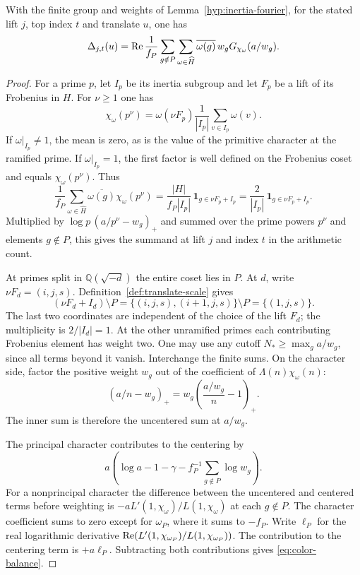\begin{lemma}
With the finite group and weights of Lemma~\ref{hyp:inertia-fourier},
for the stated lift \(j\), top index \(t\) and translate \(u\), one has
\begin{equation}\label{eq:color-balance}
  \Delta_{j,t}(u)=
  \operatorname{Re}\frac1{f_P}\sum_{g\notin P}\sum_{\omega\in\widehat H}
       \overline{\omega(g)}\,w_g G_{\chi_\omega}(a/w_g).
\end{equation}
\end{lemma}

\begin{proof}
For a prime \(p\), let \(I_p\) be its
inertia subgroup and let \(F_p\) be a lift of its Frobenius in
\(H\). For \(\nu\ge1\) one has
\[
 \chi_\omega(p^\nu)
   =\omega(\nu F_p)\frac1{|I_p|}\sum_{v\in I_p}\omega(v).
\]
If \(\omega|_{I_p}\ne1\), the mean is zero, as is the value
of the primitive character at the ramified prime. If
\(\omega|_{I_p}=1\), the first factor is well defined on the
Frobenius coset and equals \(\chi_\omega(p^\nu)\). Thus
\[
 \frac1{f_P}\sum_{\omega\in\widehat H}
       \overline{\omega(g)}\chi_\omega(p^\nu)
 =\frac{|H|}{f_P|I_p|}\,\mathbf 1_{g\in\nu F_p+I_p}
 =\frac{2}{|I_p|}\,\mathbf 1_{g\in\nu F_p+I_p}.
\] Multiplied by
\(\log p\,(a/p^\nu-w_g)_+\) and summed over the prime powers
\(p^\nu\) and elements \(g\notin P\),
this gives the summand at lift \(j\) and index \(t\) in the arithmetic count.


At primes split in \(\mathbb Q(\sqrt{-d})\) the entire coset
lies in \(P\). At \(d\), write \(\nu F_d=(i,j,s)\). Definition~\ref{def:translate-scale} gives
\[
 (\nu F_d+I_d)\setminus P
   =\{(i,j,s),(i+1,j,s)\}\setminus P=\{(1,j,s)\}.
\]
The last two coordinates are independent of the choice of the lift \(F_d\);
the multiplicity is \(2/|I_d|=1\). At the other
unramified primes each contributing Frobenius element has weight two.
One may use any cutoff \(N_*\ge\max_g a/w_g\), since all terms
beyond it vanish. Interchange the finite sums. On the character side, factor the positive weight \(w_g\) out of the coefficient of \(\Lambda(n)\chi_\omega(n)\):
\[
 (a/n-w_g)_+
 =w_g\left(\frac{a/w_g}{n}-1\right)_+ .
\]
The inner sum is therefore the uncentered sum at \(a/w_g\).

The principal character contributes to the centering by
\[
 a\left(\log a-1-\gamma-f_P^{-1}\sum_{g\notin P}\log w_g\right).
\]
For a nonprincipal character the difference between the
uncentered and centered terms before weighting is
\(-aL'(1,\chi_\omega)/L(1,\chi_\omega)\) at each \(g\notin P\).
The character coefficient sums to zero except for
\(\omega_P\), where it sums to \(-f_P\).
Write \(\ell_P\) for the real logarithmic derivative
\(\operatorname{Re}(L'(1,\chi_{\omega_P})/L(1,\chi_{\omega_P}))\).
The contribution to the centering term is \(+a\ell_P\).
Subtracting both contributions gives \eqref{eq:color-balance}.
\end{proof}

